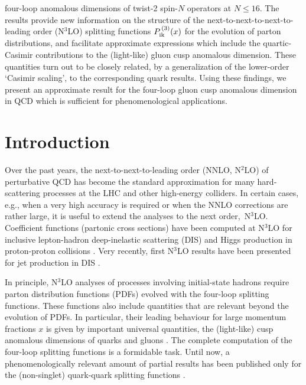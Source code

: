 \documentclass[12pt]{article}
\begin{document}
\begin{titlepage}
four-loop anomalous dimensions of twist-2 spin-$N$ operators at $N \leq 16$.
The results provide new information on the structure of the 
next-to-next-to-next-to-leading order (N$^3$LO) splitting functions 
$P_{\rm ik}^{\,(3)}(x)$ for the evolution of parton distributions, and 
facilitate approximate expressions which include the quartic-Casimir 
contributions to the (light-like) gluon cusp anomalous dimension.
These quantities turn out to be closely related, by a generalization of the
lower-order `Casimir scaling', to the corresponding quark results.
Using these findings, we present an approximate result for the four-loop gluon 
cusp anomalous dimension in QCD which is sufficient for phenomenological 
applications.

\vspace*{0.2cm}
\end{titlepage}

%
\section{Introduction}
\label{sec:intro}
\vspace*{-1mm}

Over the past years,
the next-to-next-to-leading order (NNLO, N$^2$LO) of perturbative QCD has 
become the standard approximation for many hard-scattering processes at the
LHC and other high-energy colliders.
In certain cases, e.g., when a very high accuracy is required or when the
NNLO corrections are rather large, it is useful to extend the analyses to 
the next order,~N$^3$LO.
%
Coefficient functions (partonic cross sections) have been computed at N$^3$LO
for inclusive lepton-hadron deep-inelastic scattering (DIS) \cite{MVV610+} 
and Higgs production in proton-proton collisions \cite{Higgs1,Higgs2}. 
Very recently, first N$^3$LO results have been presented for jet production 
in DIS \cite{N3LOjet}.

In principle, N$^3$LO analyses of processes involving initial-state hadrons 
require parton distribution functions (PDFs) evolved with the four-loop 
splitting functions.
These functions also include quantities that are relevant beyond the evolution 
of PDFs. 
In particular, their leading behaviour for large momentum fractions $x$ is 
given by important universal quantities, the (light-like) cusp anomalous 
dimensions of quarks and gluons \cite{Korch89}.
The complete computation of the four-loop splitting functions is a formidable
task. Until now, a phenomenologically relevant amount of partial results has 
been published only for the (non-singlet) quark-quark splitting functions 
\cite{DRUVV,MRUVV1}.
\end{document}
